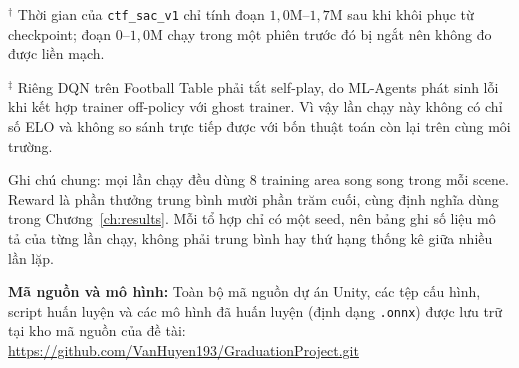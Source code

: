 \begin{table}[H]
\vspace{0.2cm}
{\footnotesize
$^{\dagger}$ Thời gian của \texttt{ctf\_sac\_v1} chỉ tính đoạn $1{,}0$M--$1{,}7$M sau khi khôi phục từ checkpoint; đoạn $0$--$1{,}0$M chạy trong một phiên trước đó bị ngắt nên không đo được liền mạch.

\smallskip
$^{\ddagger}$ Riêng DQN trên Football Table phải tắt self-play, do ML-Agents phát sinh lỗi khi kết hợp trainer off-policy với ghost trainer. Vì vậy lần chạy này không có chỉ số ELO và không so sánh trực tiếp được với bốn thuật toán còn lại trên cùng môi trường.

\smallskip
Ghi chú chung: mọi lần chạy đều dùng $8$ training area song song trong mỗi scene. Reward là
phần thưởng trung bình mười phần trăm cuối, cùng định nghĩa dùng trong
Chương~\ref{ch:results}. Mỗi tổ hợp chỉ có một seed, nên bảng ghi số liệu mô tả của từng
lần chạy, không phải trung bình hay thứ hạng thống kê giữa nhiều lần lặp.}
\end{table}

\vspace{0.5cm}
\noindent\textbf{Mã nguồn và mô hình:} Toàn bộ mã nguồn dự án Unity, các tệp cấu hình,
script huấn luyện và các mô hình đã huấn luyện (định dạng \texttt{.onnx}) được lưu trữ
tại kho mã nguồn của đề tài: \url{https://github.com/VanHuyen193/GraduationProject.git}
